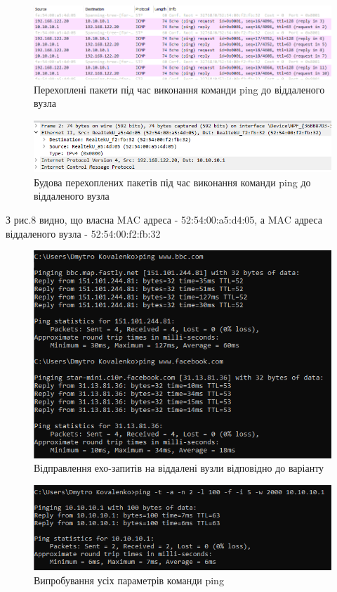 \documentclass{article}
\begin{document}
\begin{normalsize}
\begin{figure}[H]
	\centering
	\includegraphics[scale=0.55]{prw}
	\caption{Перехоплені пакети під час виконання команди ping до віддаленого вузла}
\end{figure}

\begin{figure}[H]
	\centering
	\includegraphics[scale=0.65]{prw2}
	\caption{Будова перехоплених пакетів під час виконання команди ping до віддаленого вузла}
\end{figure}

З рис.8 видно, що власна MAC адреса - 52:54:00:a5:d4:05, а MAC адреса віддаленого вузла - 52:54:00:f2:fb:32

\begin{figure}[H]
	\centering
	\includegraphics[scale=0.8]{bbcfacebook}
	\caption{Відправлення ехо-запитів на віддалені вузли відповідно до варіанту}
\end{figure}

\begin{figure}[H]
	\centering
	\includegraphics[scale=0.8]{pall}
	\caption{Випробування усіх параметрів команди ping}
\end{figure}


\end{normalsize}
\end{document}
